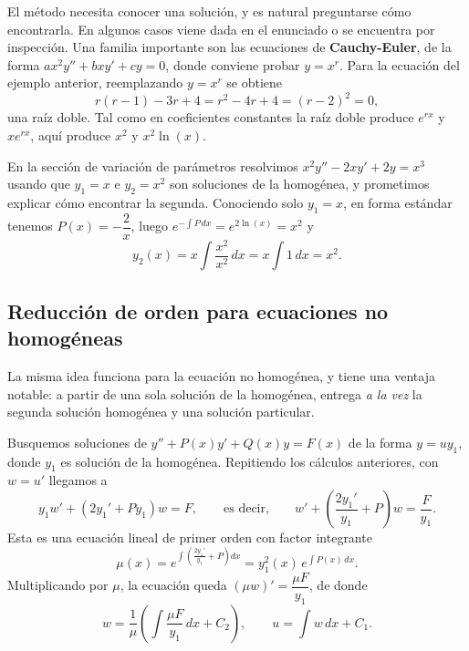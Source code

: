 \begin{remark}
    El m\'etodo necesita conocer una soluci\'on, y es natural preguntarse c\'omo encontrarla. En algunos casos viene dada en el enunciado o se encuentra por inspecci\'on. Una familia importante son las ecuaciones de \textbf{Cauchy-Euler}, de la forma $ax^2y''+bxy'+cy=0$, donde conviene probar $y=x^r$. Para la ecuaci\'on del ejemplo anterior, reemplazando $y=x^r$ se obtiene
    \[
    r(r-1)-3r+4=r^2-4r+4=(r-2)^2=0,
    \]
    una ra\'iz doble. Tal como en coeficientes constantes la ra\'iz doble produce $e^{rx}$ y $xe^{rx}$, aqu\'i produce $x^2$ y $x^2\ln(x)$.
\end{remark}

\begin{example}
    En la secci\'on de variaci\'on de par\'ametros resolvimos $x^2y''-2xy'+2y=x^3$ usando que $y_1=x$ e $y_2=x^2$ son soluciones de la homog\'enea, y prometimos explicar c\'omo encontrar la segunda. Conociendo solo $y_1=x$, en forma est\'andar tenemos $P(x)=-\dfrac{2}{x}$, luego $e^{-\int P\,dx}=e^{2\ln(x)}=x^2$ y
    \[
    y_2(x)=x\int\dfrac{x^2}{x^2}\,dx=x\int1\,dx=x^2.
    \]
\end{example}

\subsection*{Reducci\'on de orden para ecuaciones no homog\'eneas}

La misma idea funciona para la ecuaci\'on no homog\'enea, y tiene una ventaja notable: a partir de una sola soluci\'on de la homog\'enea, entrega \emph{a la vez} la segunda soluci\'on homog\'enea y una soluci\'on particular.

\begin{remark}[Deducci\'on]
    Busquemos soluciones de $y''+P(x)y'+Q(x)y=F(x)$ de la forma $y=uy_1$, donde $y_1$ es soluci\'on de la homog\'enea. Repitiendo los c\'alculos anteriores, con $w=u'$ llegamos a
    \[
    y_1w'+\left(2y_1'+Py_1\right)w=F,\qquad\text{es decir,}\qquad w'+\left(\dfrac{2y_1'}{y_1}+P\right)w=\dfrac{F}{y_1}.
    \]
    Esta es una ecuaci\'on lineal de primer orden con factor integrante
    \[
    \mu(x)=e^{\int\left(\frac{2y_1'}{y_1}+P\right)dx}=y_1^2(x)\,e^{\int P(x)\,dx}.
    \]
    Multiplicando por $\mu$, la ecuaci\'on queda $(\mu w)'=\dfrac{\mu F}{y_1}$, de donde
    \[
    w=\dfrac{1}{\mu}\left(\int\dfrac{\mu F}{y_1}\,dx+C_2\right),\qquad u=\int w\,dx+C_1.
    \]
\end{remark}

